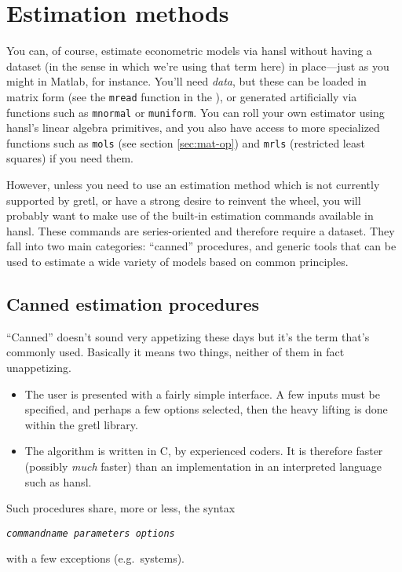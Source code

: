 \chapter{Estimation methods}
\label{chap:estimation}

You can, of course, estimate econometric models via hansl without
having a dataset (in the sense in which we're using that term here) in
place---just as you might in \textsf{Matlab}, for instance. You'll
need \textit{data}, but these can be loaded in matrix form (see the
\texttt{mread} function in the \GCR), or generated artificially via
functions such as \texttt{mnormal} or \texttt{muniform}. You can roll
your own estimator using hansl's linear algebra primitives, and you
also have access to more specialized functions such as \texttt{mols}
(see section \ref{sec:mat-op}) and \texttt{mrls} (restricted least
squares) if you need them.

However, unless you need to use an estimation method which is not
currently supported by gretl, or have a strong desire to reinvent the
wheel, you will probably want to make use of the built-in estimation
commands available in hansl. These commands are series-oriented and
therefore require a dataset. They fall into two main categories:
``canned'' procedures, and generic tools that can be used to estimate
a wide variety of models based on common principles.

\section{Canned estimation procedures}
\label{sec:canned}

``Canned'' doesn't sound very appetizing these days but it's the term
that's commonly used. Basically it means two things, neither of them
in fact unappetizing.
\begin{itemize}
\item The user is presented with a fairly simple interface. A few
  inputs must be specified, and perhaps a few options selected, then
  the heavy lifting is done within the gretl library.
\item The algorithm is written in C, by experienced coders. It is
  therefore faster (possibly \textit{much} faster) than an
  implementation in an interpreted language such as hansl.
\end{itemize}

Such procedures share, more or less, the syntax
\begin{flushleft}
\texttt{\emph{commandname parameters options}}
\end{flushleft}
with a few exceptions (e.g.\ systems).

